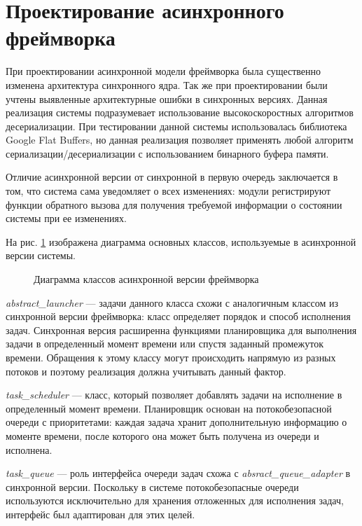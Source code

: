 \section{Проектирование асинхронного фреймворка}

При проектировании асинхронной модели фреймворка была 
существенно изменена архитектура синхронного ядра. Так же при 
проектировании были учтены выявленные архитектурные ошибки в 
синхронных версиях. Данная реализация системы подразумевает 
использование высокоскоростных алгоритмов десериализации. При 
тестировании данной системы использовалась библиотека Google 
Flat Buffers, но данная реализация позволяет применять любой 
алгоритм сериализации/десериализации с использованием бинарного 
буфера памяти.

Отличие асинхронной версии от синхронной в первую очередь заключается в том, что система сама уведомляет о всех изменениях: модули регистрируют функции обратного вызова для получения требуемой информации о состоянии системы при ее изменениях.

На рис. \ref{im:2_3_1_async} изображена диаграмма основных классов, используемые в асинхронной версии системы.

\begin{figure}[h]
    \caption{Диаграмма классов асинхронной версии фреймворка}
    \label{im:2_3_1_async}
\end{figure}

\textit{abstract\_launcher} --- задачи данного класса схожи с аналогичным классом из синхронной версии фреймворка: класс определяет порядок и способ исполнения задач. Синхронная версия расширенна функциями планировщика для выполнения задачи в определенный момент времени или спустя заданный промежуток времени. Обращения к этому классу могут происходить напрямую из разных потоков и поэтому реализация должна учитывать данный фактор.

\textit{task\_scheduler} --- класс, который позволяет добавлять задачи на исполнение в определенный момент времени. Планировщик основан на потокобезопасной очереди с приоритетами: каждая задача хранит дополнительную информацию о моменте времени, после которого она может быть получена из очереди и исполнена.

\textit{task\_queue} --- роль интерфейса очереди задач схожа с 
\textit{absract\_queue\_adapter} в синхронной версии. Поскольку 
в системе потокобезопасные очереди используются исключительно 
для хранения отложенных для исполнения задач, интерфейс был 
адаптирован для этих целей.

